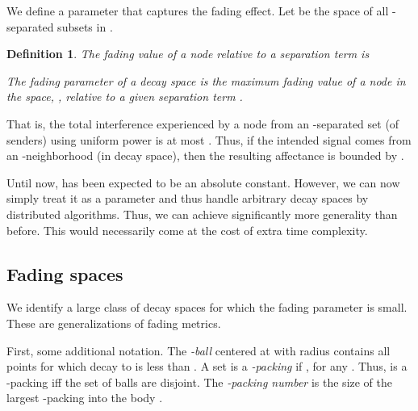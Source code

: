\documentclass[11pt]{amsart}
\newtheorem{definition}{Definition}[section]
\newcommand{\authorcomment}[1]{}
\begin{document}
\iffalse One candidate approach for extending the fading property to decay
spaces would be to apply the same argument to the corresponding
quasi-distance metric.  If the result (quasi-)metric is indeed a
fading metric, everything is fine and well.  The problem is that in
the process of turning decays into quasi-distances, we may have
introduced a non-fading behavior.  For the purpose of metricity, we
want decays to be small, but for fading purposes, they need to be
sufficiently large.  \authorcomment{This is actually not true. It is indeed
  sufficient to check if the induced quasi-distance metric is a fading
  metric w.r.t\ . Which means we could omit the fading
  lemma.... But, it should be useful to have it argued in full
  generality directly in the decay space. }
\fi

We define a parameter  that captures the fading effect.
Let  be the space of all -separated subsets in .
\begin{definition}
The \emph{fading value}  of a node 
relative to a separation term  is 

The \emph{fading parameter}  of a decay space 
is the maximum fading value of a node in the space,
,
relative to a given separation term .
\label{defn:fading}
\end{definition}



That is, the total interference  experienced by a node  from an -separated set  (of senders) using uniform power  is at most . Thus, if the intended signal comes from an -neighborhood (in decay space), then the resulting affectance is bounded by .

Until now,  has been expected to be an absolute constant.
However, we can now simply treat it as a parameter and thus
handle arbitrary decay spaces by distributed algorithms.
Thus, we can achieve significantly more generality than before.
This would necessarily come at the cost of extra time complexity.

\subsection{Fading spaces}

We identify a large class of decay spaces for which the fading parameter is small.
These are generalizations of fading metrics.


First, some additional notation.  The \emph{-ball}  centered at  with radius 
contains all points  for which decay to  is less than .  A
set  is a \emph{-packing} if , for any
.  Thus,  is a -packing iff the set
 of balls are disjoint.  The \emph{-packing
  number}  is the size of the largest
-packing into the body .  
\end{document}
